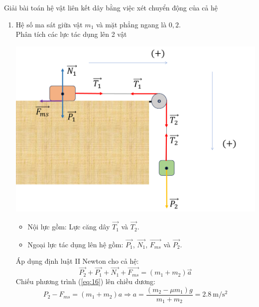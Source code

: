 \begin{dang}{Giải bài toán hệ vật liên kết dây bằng việc xét chuyển động của cả hệ}
{{\begin{enumerate}[label=\alph*)]
\begin{itemize}
		\end{itemize}
	Áp dụng định luật II Newton cho cả hệ:
	\begin{equation}
		\label{eq:15}
		\overrightarrow{P_2}+\overrightarrow{P_1}+\overrightarrow{N_1}=\left(m_1+m_2\right)\vec{a}
	\end{equation} 
	Chiếu phương trình (\ref{eq:15}) lên chiều dương:
	$$P_2=\left(m_1+m_2\right)a \Rightarrow a=\dfrac{m_2g}{m_1+m_2}=\SI{4}{\meter/\second^2}$$
	Xét chuyển động của vật 1, lực căng dây:
	$$T_1=m_1a=\SI{2.4}{\newton}$$
	Quãng đường mỗi vật đi được sau 1 giây:
	$$s=\dfrac{1}{2}at^2=\dfrac{1}{2}\cdot\left(\SI{4}{\meter/\second^2}\right)\cdot\left(\SI{1}{\second}\right)^2=\SI{2}{\meter}$$
	Lực nén lên trục ròng rọc:
	$$\overrightarrow{Q}=\overrightarrow{T_1}+\overrightarrow{T_2}$$
	$$\Rightarrow Q=\sqrt{T^2_1+T^2_2}=T\sqrt{2}=\xsi{24\sqrt{2}}{\newton}.$$
		\item Hệ số ma sát giữa vật $m_1$ và mặt phẳng ngang là $0,2$.\\
		Phân tích các lực tác dụng lên 2 vật
		\begin{center}
			\includegraphics[width=0.6\linewidth]{../figs/VN10-2023-PH-TP021-3}
		\end{center}
		\begin{itemize}
			\item Nội lực gồm: Lực căng dây $\overrightarrow{T_1}$ và $\overrightarrow{T_2}$.
			\item Ngoại lực tác dụng lên hệ gồm: $\overrightarrow{P_1}$, $\overrightarrow{N_1}$, $\overrightarrow{F_{ms}}$ và $\overrightarrow{P_2}$.
		\end{itemize}
		Áp dụng định luật II Newton cho cả hệ:
		\begin{equation}
			\label{eq:16}
			\overrightarrow{P_2}+\overrightarrow{P_1}+\overrightarrow{N_1}+\overrightarrow{F_{ms}}=\left(m_1+m_2\right)\vec{a}
		\end{equation} 
		Chiếu phương trình (\ref{eq:16}) lên chiều dương:
		$$P_2-F_{ms}=\left(m_1+m_2\right)a \Rightarrow a=\dfrac{\left(m_2-\mu m_1\right)g}{m_1+m_2}=\SI{2.8}{\meter/\second^2}$$

\end{enumerate}}}
\end{dang}
